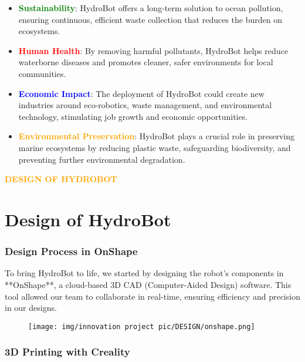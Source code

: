 \begin{itemize}
    \item \textbf{\textcolor{green}{Sustainability}}: HydroBot offers a long-term solution to ocean pollution, ensuring continuous, efficient waste collection that reduces the burden on ecosystems.
    \item \textbf{\textcolor{red}{Human Health}}: By removing harmful pollutants, HydroBot helps reduce waterborne diseases and promotes cleaner, safer environments for local communities.
    \item \textbf{\textcolor{blue}{Economic Impact}}: The deployment of HydroBot could create new industries around eco-robotics, waste management, and environmental technology, stimulating job growth and economic opportunities.
    \item \textbf{\textcolor{orange}{Environmental Preservation}}: HydroBot plays a crucial role in preserving marine ecosystems by reducing plastic waste, safeguarding biodiversity, and preventing further environmental degradation.
\end{itemize}




\newpage
\begin{center}
    \huge \textbf{\textcolor{orange}{DESIGN OF HYDROBOT}} \\[0.5cm]
\end{center}
\section{\textbf{Design of HydroBot}}
\subsubsection{{Design Process in OnShape}}
To bring HydroBot to life, we started by designing the robot’s components in **OnShape**, a cloud-based 3D CAD (Computer-Aided Design) software. This tool allowed our team to collaborate in real-time, ensuring efficiency and precision in our designs.

\begin{figure}[h!]
    \centering
    \texttt{[image: img/innovation project pic/DESIGN/onshape.png]}
\end{figure}

\subsubsection{{3D Printing with Creality}}

